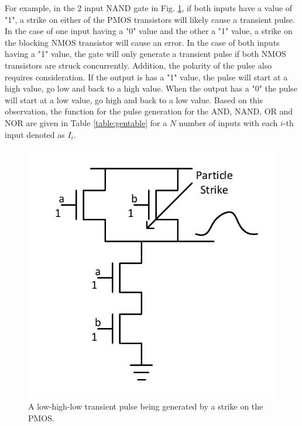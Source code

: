 For example, in the 2 input NAND gate in Fig. \ref{NANDS}, if both inputs have a value of "1", a strike on either of the PMOS transistors will likely cause a transient pulse. In the case of one input having a "0" value and the other a "1" value,  a strike on the blocking NMOS transistor will cause an error. In the case of both inputs having a "1" value, the gate will only generate a transient pulse if both NMOS transistors are struck concurrently. Addition, the polarity of the pulse also requires consideration. If the output is has a "1" value, the pulse will start at a high value, go low and back to a high value. When the output has a "0" the pulse will start at a low value, go high and back to a low value. Based on this observation, the function for the pulse generation for the AND, NAND, OR and NOR are given in Table \ref{table:gentable} for a $N$ number of inputs with each $i$-th input denoted as $I_i$.

\begin{figure}[!htbp]
	\centering
	\includegraphics[width=0.5\linewidth]{Figures/NAND_Strike}
	\caption{A low-high-low transient pulse being generated by a strike on the PMOS.}
	\label{NANDS}
\end{figure}


